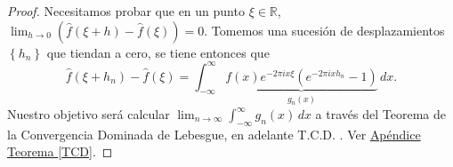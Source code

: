 \documentclass[12pt]{article}
\newcommand{\R}{\mathbb{R}}
\theoremstyle{plain}
\theoremstyle{definition}
\numberwithin{equation}{section}
\begin{document}
            \begin{proof}
                Necesitamos probar que en un punto \(\xi \in \R\), \(\lim_{h \to 0} (\hat{f}(\xi + h) - \hat{f}(\xi)) = 0\). Tomemos una sucesión de desplazamientos \(\left\{h_n\right\} \) que tiendan a cero, se tiene entonces que
                \begin{equation*}
                    \hat{f}(\xi + h_n) - \hat{f}(\xi) = \int_{-\infty}^{\infty} \underbrace{f(x)e^{-2\pi ix\xi} (e^{-2\pi i x h_n} - 1)}_{g_n(x)}\,dx.
                \end{equation*}
                Nuestro objetivo será calcular \(\lim_{n \to \infty} \int_{-\infty}^{\infty} g_n(x)\,dx\) a través del Teorema de la Convergencia Dominada de Lebesgue, en adelante T.C.D. . Ver \hyperref[TCD]{Apéndice Teorema \ref*{TCD}}.
    

\end{proof}
\end{document}
